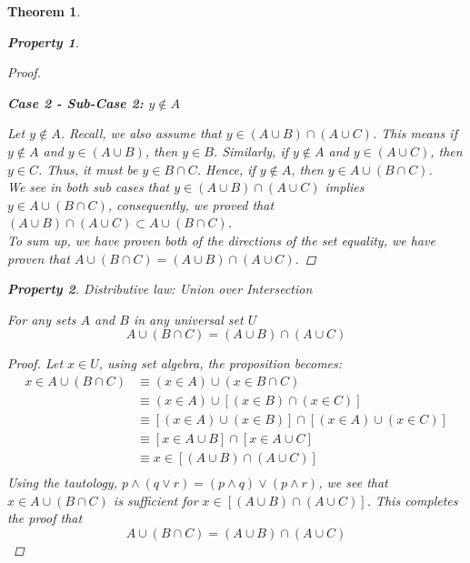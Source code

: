 \documentclass{book}
\newtheorem{theorem}{Theorem}[section]
\newtheorem{property}{Property}[theorem]
\theoremstyle{definition}
\theoremstyle{remark}
\begin{document}
\begin{theorem}
\begin{property}
\begin{proof}
                    \begin{flushleft} \textbf{Case 2 - Sub-Case 2: $y \notin A$} \end{flushleft}  
                        Let $y \notin A$. Recall, we also assume that $y \in (A \cup B) \cap (A \cup C)$. This means if $y \notin A$ and $y \in (A \cup B)$, then $y \in B$. Similarly, if $y \notin A$ and $y \in (A \cup C)$, then $y \in C$. Thus, it must be $y \in B \cap C$. Hence, if $y \notin A$, then $y \in A \cup (B \cap C)$. \\
                
                We see in both sub cases that $y \in (A \cup B) \cap (A \cup C)$ implies $y \in A \cup (B \cap C)$, consequently, we proved that $(A \cup B) \cap (A \cup C) \subset A \cup (B \cap C)$. \\   
            To sum up, we have proven both of the directions of the set equality, we have proven that $A \cup (B \cap C) = (A \cup B) \cap (A \cup C)$. 
        \end{proof}
    \end{property}
    
    
    \newpage
    \begin{property}
    Distributive law: Union over Intersection \\
        \begin{tcolorbox}
            For any sets $A$ and $B$ in any universal set $U$
                \begin{equation*}
                    A \cup (B \cap C) = (A \cup B) \cap (A \cup C)
                \end{equation*}
        \end{tcolorbox}
    
        \begin{proof}
            Let $x \in U$, using set algebra, the proposition becomes: 
                \begin{align*}
                    x \in A \cup (B \cap C) & \equiv (x \in A) \cup (x \in B \cap C) \\
                    & \equiv (x \in A) \cup [(x \in B) \cap (x \in C)] \\
                    & \equiv [(x \in A) \cup (x \in B)] \cap [(x \in A) \cup (x \in C)] \\
                    & \equiv [x \in A \cup B] \cap [x \in A \cup C] \\
                    & \equiv x \in [(A \cup B) \cap (A \cup C)] \\
                \end{align*}
            Using the tautology, $p \wedge (q \vee r) = (p \wedge q) \vee (p \wedge r)$, we see that $x \in A \cup (B \cap C)$ is sufficient for $x \in [(A \cup B) \cap (A \cup C)]$. This completes the proof that $$ A \cup (B \cap C) = (A \cup B) \cap (A \cup C) $$
        \end{proof}
    \end{property}
    

\end{theorem}
\end{document}
